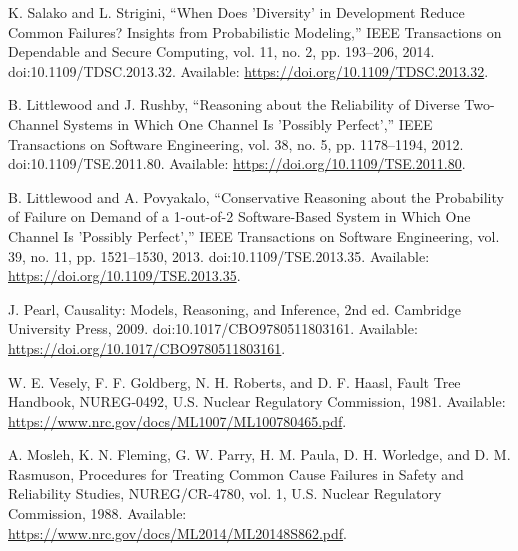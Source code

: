  K. Salako and L. Strigini, ``When Does 'Diversity' in Development Reduce Common Failures? Insights from Probabilistic Modeling,'' IEEE Transactions on Dependable and Secure Computing, vol. 11, no. 2, pp. 193--206, 2014. doi:10.1109/TDSC.2013.32. Available: \url{https://doi.org/10.1109/TDSC.2013.32}.

 B. Littlewood and J. Rushby, ``Reasoning about the Reliability of Diverse Two-Channel Systems in Which One Channel Is 'Possibly Perfect','' IEEE Transactions on Software Engineering, vol. 38, no. 5, pp. 1178--1194, 2012. doi:10.1109/TSE.2011.80. Available: \url{https://doi.org/10.1109/TSE.2011.80}.

 B. Littlewood and A. Povyakalo, ``Conservative Reasoning about the Probability of Failure on Demand of a 1-out-of-2 Software-Based System in Which One Channel Is 'Possibly Perfect','' IEEE Transactions on Software Engineering, vol. 39, no. 11, pp. 1521--1530, 2013. doi:10.1109/TSE.2013.35. Available: \url{https://doi.org/10.1109/TSE.2013.35}.

 J. Pearl, Causality: Models, Reasoning, and Inference, 2nd ed. Cambridge University Press, 2009. doi:10.1017/CBO9780511803161. Available: \url{https://doi.org/10.1017/CBO9780511803161}.

 W. E. Vesely, F. F. Goldberg, N. H. Roberts, and D. F. Haasl, Fault Tree Handbook, NUREG-0492, U.S. Nuclear Regulatory Commission, 1981. Available: \url{https://www.nrc.gov/docs/ML1007/ML100780465.pdf}.

 A. Mosleh, K. N. Fleming, G. W. Parry, H. M. Paula, D. H. Worledge, and D. M. Rasmuson, Procedures for Treating Common Cause Failures in Safety and Reliability Studies, NUREG/CR-4780, vol. 1, U.S. Nuclear Regulatory Commission, 1988. Available: \url{https://www.nrc.gov/docs/ML2014/ML20148S862.pdf}.
